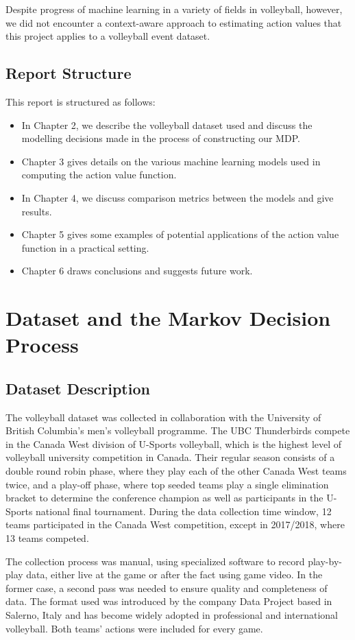\documentclass{sfuthesis}
\begin{document}
	Despite progress of machine learning in a variety of fields in volleyball, however, we did not encounter a context-aware approach to estimating action values  that this project applies to a volleyball event dataset.
	
	\section{Report Structure}
	This report is structured as follows:
	\begin{itemize}
		\item In Chapter 2, we describe the volleyball dataset used and discuss the modelling decisions made in the process of constructing our MDP.
		\item Chapter 3 gives details on the various machine learning models used in computing the action value function.
		\item In Chapter 4, we discuss comparison metrics between the models and give results.
		\item Chapter 5 gives some examples of potential applications of the action value function in a practical setting.
		\item Chapter 6 draws conclusions and suggests future work.
	\end{itemize}
	
	\chapter{Dataset and the Markov Decision Process}
	
	\section{Dataset Description}
	The volleyball dataset was collected in collaboration with the University of British Columbia's men's volleyball programme. The UBC Thunderbirds compete in the Canada West division of U-Sports volleyball, which is the highest level of volleyball university competition in Canada. Their regular season consists of a double round robin phase, where they play each of the other Canada West teams twice, and a play-off phase, where top seeded teams play a single elimination bracket to determine the conference champion as well as participants in the U-Sports national final tournament. During the data collection time window, 12 teams participated in the Canada West competition, except in 2017/2018, where 13 teams competed.
	
	The collection process was manual, using specialized software to record play-by-play data, either live at the game or after the fact using game video. In the former case, a second pass was needed to ensure quality and completeness of data. The format used was introduced by the company Data Project based in Salerno, Italy and has become widely adopted in professional and international volleyball. Both teams' actions were included for every game.
	
\end{document}
